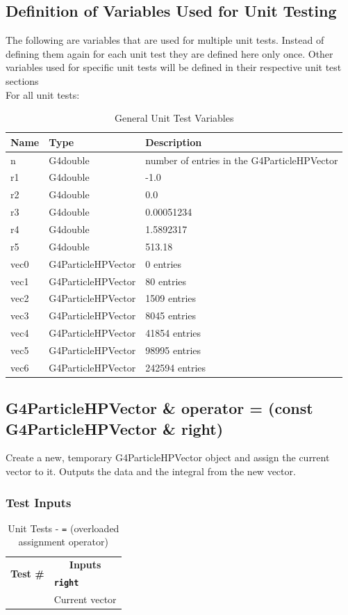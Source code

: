 \documentclass[12pt]{article}
\newcounter{TestCounter}
\begin{document}
\subsection{Definition of Variables Used for Unit Testing}
The following are variables that are used for multiple unit tests. Instead of defining them again for each unit test they are defined here only once. Other variables used for specific unit tests will be defined in their respective unit test sections\\
For all unit tests:
\begin{table}[H]
\centering
\caption{General Unit Test Variables}\label{gen_var_table}
\begin{tabular}{lll}
\toprule
	\bf Name & \bf Type & \bf Description\\\midrule
	n 	& G4double 			& number of entries in the G4ParticleHPVector\\
	r1 	& G4double 			& -1.0\\
	r2	& G4double			& 0.0\\
	r3 	& G4double 			& 0.00051234\\
	r4 	& G4double 			& 1.5892317\\
	r5 	& G4double 			& 513.18\\
	vec0 & G4ParticleHPVector 	& 0 entries\\
	vec1 & G4ParticleHPVector	& 80 entries\\
	vec2 & G4ParticleHPVector 	& 1509 entries\\
	vec3 & G4ParticleHPVector 	& 8045 entries\\
	vec4 & G4ParticleHPVector 	& 41854 entries\\
	vec5 & G4ParticleHPVector 	& 98995 entries\\
	vec6 & G4ParticleHPVector 	& 242594 entries\\
\bottomrule		
\end{tabular}
\end{table}

\subsection{G4ParticleHPVector \& operator = (const G4ParticleHPVector \& right)}
	
	Create a new, temporary G4ParticleHPVector object and assign the current vector to it. Outputs the data and the integral from the new vector.

	\subsubsection{Test Inputs}
		\begin{table}[H]
		\centering
		\caption{Unit Tests - \texttt{=} (overloaded assignment operator)}\label{OperatorEquals_unit}
		\begin{tabular}{cl}
		\toprule
		\multirow{2}{*}{\bf Test \#}  & \multicolumn{1}{c}{\bf Inputs}\\
		& \bf \texttt{right}\\\midrule
		{TestCounter}\arabic{TestCounter}\label{OperatorEquals_0} & Current vector\\
		\bottomrule
		\end{tabular}
		\end{table}
\end{document}
